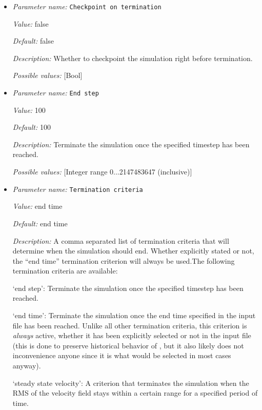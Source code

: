 \begin{itemize}
\item {\it Parameter name:} {\tt Checkpoint on termination}
\label{parameters:Termination criteria/Checkpoint on termination}


{\it Value:} false


{\it Default:} false


{\it Description:} Whether to checkpoint the simulation right before termination.


{\it Possible values:} [Bool]
\item {\it Parameter name:} {\tt End step}
\label{parameters:Termination criteria/End step}


{\it Value:} 100


{\it Default:} 100


{\it Description:} Terminate the simulation once the specified timestep has been reached.


{\it Possible values:} [Integer range 0...2147483647 (inclusive)]
\item {\it Parameter name:} {\tt Termination criteria}
\label{parameters:Termination criteria/Termination criteria}


{\it Value:} end time


{\it Default:} end time


{\it Description:} A comma separated list of termination criteria that will determine when the simulation should end. Whether explicitly stated or not, the ``end time'' termination criterion will always be used.The following termination criteria are available:

`end step': Terminate the simulation once the specified timestep has been reached. 

`end time': Terminate the simulation once the end time specified in the input file has been reached. Unlike all other termination criteria, this criterion is \textit{always} active, whether it has been explicitly selected or not in the input file (this is done to preserve historical behavior of \aspect{}, but it also likely does not inconvenience anyone since it is what would be selected in most cases anyway).

`steady state velocity': A criterion that terminates the simulation when the RMS of the velocity field stays within a certain range for a specified period of time.


\end{itemize}
